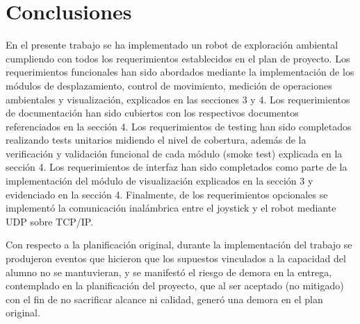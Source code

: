 
\chapter{Conclusiones} %

\label{Chapter5} %




En el presente trabajo se ha implementado un robot de exploración ambiental cumpliendo con todos los requerimientos establecidos en el plan de proyecto. Los requerimientos funcionales han sido abordados mediante la implementación de los módulos de desplazamiento, control de movimiento, medición de operaciones ambientales y visualización, explicados en las secciones 3 y 4. Los requerimientos de documentación han sido cubiertos con los respectivos documentos referenciados en la sección 4. Los requerimientos de testing han sido completados realizando tests unitarios midiendo el nivel de cobertura, además de la verificación y validación funcional de cada módulo (smoke test) explicada en la sección 4. Los requerimientos de interfaz han sido completados como parte de la implementación del módulo de visualización explicados en la sección 3 y evidenciado en la sección 4.
Finalmente, de los requerimientos opcionales se implementó la comunicación inalámbrica entre el joystick y el robot mediante UDP sobre TCP/IP.

Con respecto a la planificación original, durante la implementación del trabajo se produjeron eventos que hicieron que los supuestos vinculados a la capacidad del alumno no se mantuvieran, y se manifestó el riesgo de demora en la entrega, contemplado en la planificación del proyecto, que al ser aceptado (no mitigado) con el fin de no sacrificar alcance ni calidad, generó una demora en el plan original.


